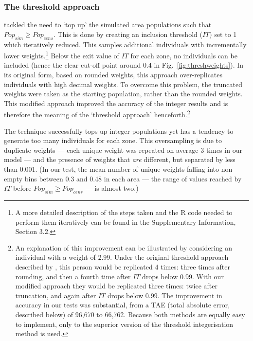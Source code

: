 \subsubsection{The threshold approach}
\citet{Ballas2005c} tackled the need to `top up' the simulated area
populations such that $Pop_{sim} \geq Pop_{cens}$. This is done by creating an inclusion
threshold ($IT$) set to 1 which iteratively
reduced. This samples additional individuals with
incrementally lower weights.\footnote{A 
more detailed description of the steps
taken and the R code needed to perform them iteratively can be found in the
Supplementary Information, Section 3.2.}
Below the exit value of $IT$ for each zone, no individuals can be included
(hence the clear cut-off point around 0.4 in Fig.~\ref{fig:threshweights}).
In its original form, based on rounded weights, this approach over-replicates
individuals with high decimal weights.
To overcome this problem, the truncated weights were taken as the starting
population, rather than the rounded weights. This modified approach improved the
accuracy of the integer results and is therefore the meaning of
the `threshold approach' henceforth.\footnote{An
explanation of this improvement can be illustrated by considering an individual
with a weight of 2.99. Under the original threshold approach described by
\citet{Ballas2005c}, this person would be replicated 4 times: three times after
rounding, and then a
fourth time after $IT$ drops below 0.99. With our modified approach they would
be replicated three times: twice after truncation, and again after $IT$ drops
below 0.99. The improvement in accuracy in our tests was substantial, from a TAE
(total absolute error, described below) of 96,670 to 66,762. Because both
methods are equally easy to implement, only to the superior
version of the threshold integerisation
method is used.}

The technique successfully tops up integer populations yet has
a tendency to generate too many individuals for each zone.
This oversampling is due to duplicate weights --- each unique weight was
repeated on average 3 times in our model --- and the presence of
weights that \emph{are} different, but separated by less than 0.001.
(In our test, the mean number of unique weights falling into
non-empty bins between 0.3 and 0.48 in each area --- the range of values
reached by $IT$ before  $Pop_{sim} \geq Pop_{cens}$ --- is almost two.)


